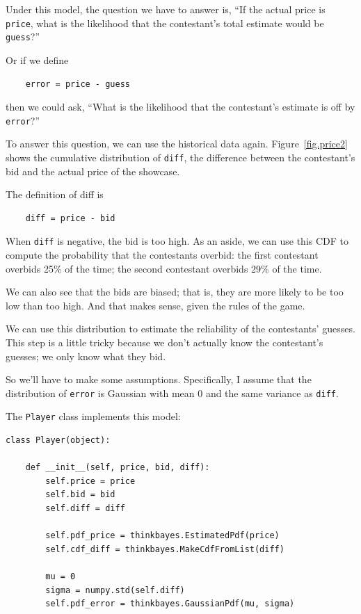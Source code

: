 \documentclass[12pt]{book}
\begin{document}
Under this model, the question we have to answer is, ``If the
actual price is {\tt price}, what is the likelihood that the
contestant's total estimate would be {\tt guess}?''

Or if we define
%
\begin{verbatim}
    error = price - guess
\end{verbatim}
%
then we could ask, ``What is the likelihood
that the contestant's estimate is off by {\tt error}?''

To answer this question, we can use the historical data again.
Figure~\ref{fig.price2} shows the cumulative distribution of {\tt diff},
the difference between the contestant's bid and the actual price
of the showcase.

The definition of diff is
%
\begin{verbatim}
    diff = price - bid
\end{verbatim}
%
When {\tt diff} is negative, the bid is too high.  As an
aside, we can use this CDF to compute the probability that the
contestants overbid: the first contestant overbids 25\% of the
time; the second contestant overbids 29\% of the time.

We can also see that the bids are biased;
that is, they are more likely to be too low than too high.  And
that makes sense, given the rules of the game.

We can use this distribution to estimate the reliability of
the contestants' guesses.  This step is a little tricky because
we don't actually know the contestant's guesses; we only know
what they bid.

So we'll have to make some assumptions.  Specifically, I
assume that the distribution of {\tt error} is Gaussian with mean 0
and the same variance as {\tt diff}.

The {\tt Player} class implements this model:

\begin{verbatim}
class Player(object):

    def __init__(self, price, bid, diff):
        self.price = price
        self.bid = bid
        self.diff = diff

        self.pdf_price = thinkbayes.EstimatedPdf(price)
        self.cdf_diff = thinkbayes.MakeCdfFromList(diff)

        mu = 0
        sigma = numpy.std(self.diff)
        self.pdf_error = thinkbayes.GaussianPdf(mu, sigma)
\end{verbatim}
\end{document}
